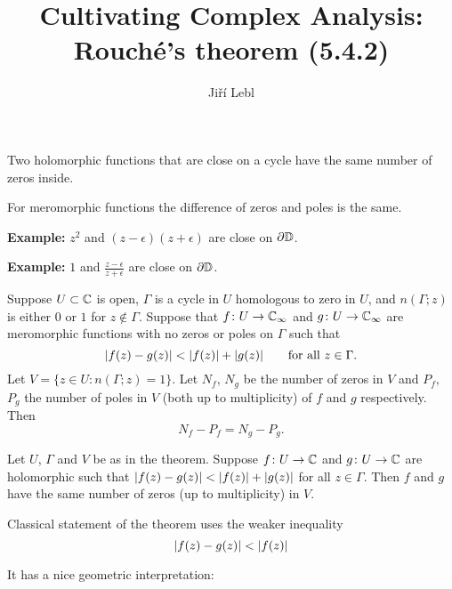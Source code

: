 \documentclass[10pt,aspectratio=169]{beamer}
\author{Ji\v{r}\'i Lebl}
\institute[OSU]{%
Departemento pri Matematiko de Oklahoma {\^S}tata Universitato}
\title{Cultivating Complex Analysis:\\%
Rouch\'e's theorem (5.4.2)}
\date{}
\begin{document}
\begin{frame}
\titlepage
\end{frame}

\begin{frame}
Two holomorphic functions that are close on a cycle
have the same number of zeros inside.

\pause
\bigskip

For meromorphic functions the difference of zeros and poles
is the same.

\pause
\bigskip

\textbf{Example:} $z^2$ and $(z-\epsilon)(z+\epsilon)$ are close on $\partial {\mathbb{D}}$.

\pause
\bigskip

\textbf{Example:} $1$ and $\frac{z-\epsilon}{z+\epsilon}$ are close on $\partial {\mathbb{D}}$.

\end{frame}

\begin{frame}
\begin{theorem}[Rouch\'e]
Suppose $U \subset {\mathbb{C}}$ is open, $\Gamma$ is
a cycle in $U$ homologous to zero in $U$,
and $n(\Gamma;z)$ is either $0$ or $1$ for $z \notin \Gamma$.
\pause
Suppose that $f \colon U \to {\mathbb{C}}_\infty$ and $g \colon U \to {\mathbb{C}}_\infty$
are meromorphic functions with no zeros or poles on
$\Gamma$ such that
\[
\lvert {f(z)-g(z)} \rvert < \lvert {f(z)} \rvert+\lvert {g(z)} \rvert
\qquad
\text{for all } z \in \Gamma .
\]
\pause
Let $V = \{ z \in U : n(\Gamma;z) = 1 \}$.
Let $N_f$, $N_g$ be the number of zeros in $V$
and $P_f$, $P_g$ the number of poles in $V$ (both up to multiplicity)
of $f$ and $g$ respectively.
\pause
Then
\begin{equation*}
N_f - P_f = 
N_g - P_g.
\end{equation*}
\end{theorem}

\pause

\begin{corollary}[Rouch\'e]
Let $U$, $\Gamma$ and $V$ be as in the theorem.
Suppose $f \colon U \to {\mathbb{C}}$ and $g \colon U \to {\mathbb{C}}$
are holomorphic such that
$\lvert {f(z)-g(z)} \rvert < \lvert {f(z)} \rvert+\lvert {g(z)} \rvert$
for all $z \in \Gamma$.  Then $f$ and $g$ have the same number of zeros (up
to multiplicity) in $V$.
\end{corollary}
\end{frame}

\begin{frame}
Classical statement of the theorem uses the weaker inequality
\[
\lvert {f(z)-g(z)} \rvert < \lvert {f(z)} \rvert
\]

\pause

It has a nice geometric interpretation:

\begin{center}
\end{center}

\end{frame}
\end{document}
